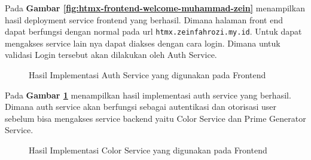 Pada \textbf{Gambar \ref{fig:htmx-frontend-welcome-muhammad-zein}} menampilkan
hasil deployment service frontend yang berhasil. Dimana halaman front end dapat
berfungsi dengan normal pada url \texttt{htmx.zeinfahrozi.my.id}. Untuk dapat
mengakses service lain nya dapat diakses dengan cara login. Dimana untuk
validasi Login tersebut akan dilakukan oleh Auth Service.

\begin{figure}[H]
  \centering
  \caption{Hasil Implementasi Auth Service yang digunakan pada Frontend}
  \label{fig:htmx-frontend-auth-service}
\end{figure}

Pada \textbf{Gambar \ref{fig:htmx-frontend-auth-service}} menampilkan hasil
implementasi auth service yang berhasil. Dimana auth service akan berfungsi
sebagai autentikasi dan otorisasi user sebelum bisa mengakses service backend
yaitu Color Service dan Prime Generator Service.

\begin{figure}[H]
  \centering
  \caption{Hasil Implementasi Color Service yang digunakan pada Frontend}
  \label{fig:htmx-frontend-color-service}
\end{figure}

